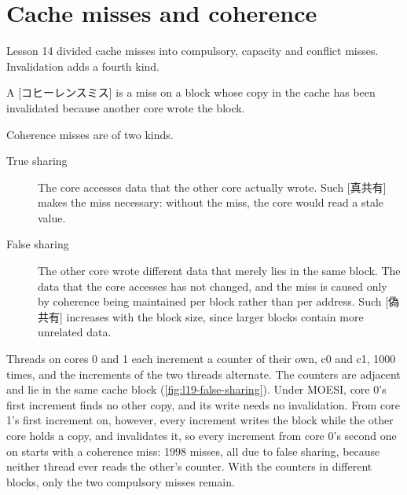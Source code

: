 \documentclass[../main.tex]{subfiles}
\begin{document}
\section{Cache misses and coherence}
\label{sec:l19-misses}

Lesson 14 divided cache misses into compulsory, capacity and conflict
misses.  Invalidation adds a fourth kind.

\begin{definition}
  A [コヒーレンスミス] is a miss on a block whose copy in
  the cache has been invalidated because another core wrote the block.
\end{definition}

Coherence misses are of two kinds.
\begin{description}
  \item[True sharing] The core accesses data that the other core actually
    wrote.  Such [真共有] makes the miss necessary: without
    the miss, the core would read a stale value.
  \item[False sharing] The other core wrote different data that merely lies
    in the same block.  The data that the core accesses has not changed, and
    the miss is caused only by coherence being maintained per block rather than
    per address.  Such [偽共有] increases with the block
    size, since larger blocks contain more unrelated data.
\end{description}

\begin{example}
  \label{ex:l19-false-sharing}
  Threads on cores 0 and 1 each increment a counter of their own, c0 and c1,
  \num{1000} times, and the increments of the two threads alternate.  The
  counters are adjacent and lie in the same cache block
  (\cref{fig:l19-false-sharing}).  Under MOESI, core 0's first increment
  finds no other copy, and its write needs no invalidation.  From core 1's
  first increment on, however, every increment writes the block while the
  other core holds a copy, and invalidates it, so every increment from core
  0's second one on starts with a coherence miss: \num{1998} misses, all due
  to false sharing, because neither thread ever reads the other's counter.
  With the counters in different blocks, only the two compulsory misses
  remain.
\end{example}
\begin{marginfigure}
  \resizebox{\linewidth}{!}{}
  \caption{False sharing: counters used by different cores lie in the same
    cache block.}
  \label{fig:l19-false-sharing}
\end{marginfigure}
\end{document}
